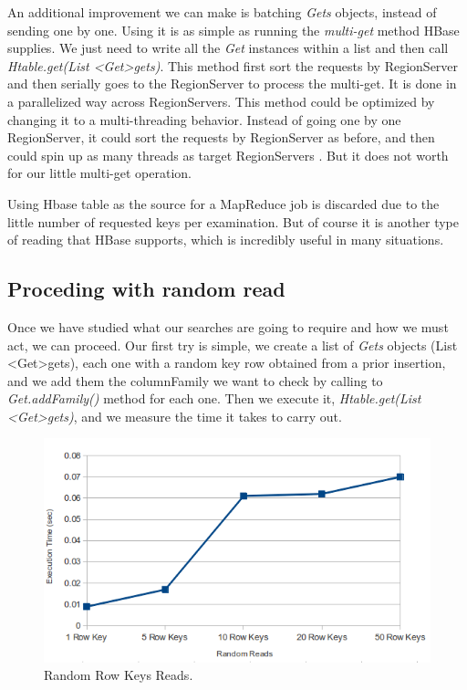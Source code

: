 An additional improvement we can make is batching \textit{Gets} objects, instead of sending one by one. Using it is as simple as running the \textit{multi-get} method HBase supplies. We just need to write all the \textit{Get} instances within a list and then call \textit{Htable.get(List \textless{Get}\textgreater gets)}. This method first sort the requests by RegionServer and then serially goes to the RegionServer to process the multi-get. It is done in a parallelized way across RegionServers. 
This method could be optimized by changing it to a multi-threading behavior. Instead of going one by one RegionServer, it could sort the requests by RegionServer as before, and then could spin up as many threads as target RegionServers \cite{http://comments.gmane.org/gmane.comp.java.hadoop.hbase.user/34417}. But it does not worth for our little multi-get operation.

\bigskip

Using Hbase table as the source for a MapReduce job is discarded due to the little number of requested keys per examination. But of course it is another type of reading that HBase supports, which is incredibly useful in many situations. 
\par

\subsection{Proceding with random read}

Once we have studied what our searches are going to require and how we must act, we can proceed. Our first try is simple, we create a list of \textit{Gets} objects (List \textless{Get}\textgreater gets), each one with a random key row obtained from a prior insertion, and we add them the columnFamily we want to check by calling to \textit{Get.addFamily()} method for each one. Then we execute it, \textit{Htable.get(List \textless{Get}\textgreater gets)}, and we measure the time it takes to carry out.


\begin{figure}[htb]
\centering
\includegraphics[width=1\textwidth]{./images/randomReads.png}
\caption{Random Row Keys Reads.} \label{fig:randomReads}
\end{figure}




